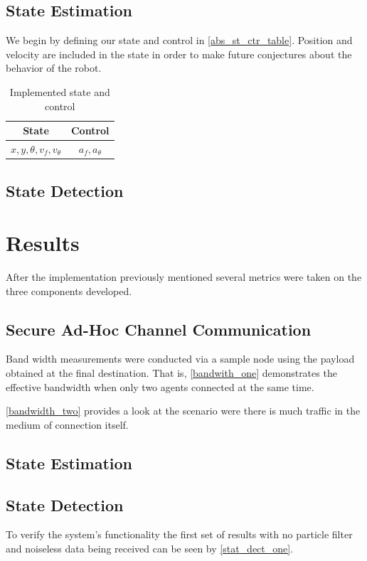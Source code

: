 \documentclass[conference]{IEEEtran}
\begin{document}
\subsection{State Estimation}
We begin by defining our state and control in \autoref{abs_st_ctr_table}. Position and velocity are included in the state in order to make future conjectures about the behavior of the robot.

\begin{table}[h] \label{abs_st_ctr_table} \caption{Implemented state and control}
\begin{center}
\begin{tabular}{c|c}
State & Control\\
\hline
$x,y,\theta,v_f,v_\theta$ & $a_f,a_\theta$\\
\end{tabular}
\end{center}
\end{table}


\subsection{State Detection}


\section{Results} \label{Results}
After the implementation previously mentioned several metrics were taken on the three components developed.

\subsection{Secure Ad-Hoc Channel Communication}
Band width measurements were conducted via a sample node using the payload obtained at the final destination. That is, \autoref{bandwith_one} demonstrates the effective bandwidth when only two agents connected at the same time.

\autoref{bandwidth_two} provides a look at the scenario were there is much traffic in the medium of connection itself.


\subsection{State Estimation}



\subsection{State Detection}
To verify the system's functionality the first set of results with no particle filter and noiseless data being received can be seen by \autoref{stat_dect_one}. 
\end{document}
